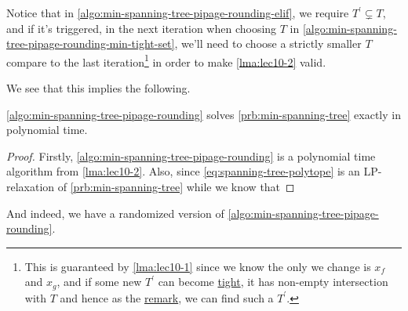 \begin{note}
	Notice that in \autoref{algo:min-spanning-tree-pipage-rounding-elif}, we require \(T^\prime \subsetneq T\), and if it's triggered, in the next iteration when choosing \(T\) in \autoref{algo:min-spanning-tree-pipage-rounding-min-tight-set}, we'll need to choose a strictly smaller \(T\) compare to the last iteration\footnote{This is guaranteed by \autoref{lma:lec10-1} since we know the only we change is \(x_f\) and \(x_g\), and if some new \(T^\prime \) can become \hyperref[not:tight]{tight}, it has non-empty intersection with \(T\) and hence as the \hyperref[rmk:lec10-1]{remark}, we can find such a \(T^\prime \).} in order to make \autoref{lma:lec10-2} valid.
\end{note}

We see that this implies the following.

\begin{theorem}
	\autoref{algo:min-spanning-tree-pipage-rounding} solves \autoref{prb:min-spanning-tree} exactly in polynomial time.
\end{theorem}
\begin{proof}
	Firstly, \autoref{algo:min-spanning-tree-pipage-rounding} is a polynomial time algorithm from \autoref{lma:lec10-2}. Also, since \autoref{eq:spanning-tree-polytope} is an LP-relaxation of \autoref{prb:min-spanning-tree} while we know that
\end{proof}

And indeed, we have a randomized version of \autoref{algo:min-spanning-tree-pipage-rounding}.

